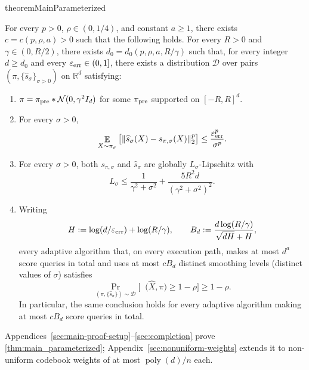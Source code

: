 \documentclass[11pt,letterpaper]{article}
\DeclareMathOperator*{\E}{\mathbb{E}}
\DeclareMathOperator*{\poly}{poly}
\newcommand{\1}{\mathbbm{1}}
\DeclareMathOperator{\TV}{d_{\mathrm{TV}}}
\begin{document}
\begin{restatable}{theorem}{MainParameterized}
  \label{thm:main_parameterized}

For every $p>0$, $\rho\in(0,1/4)$, and constant $a\ge1$, there exists
  $c=c(p,\rho,a)>0$ such that the following holds.
  For every $R>0$ and $\gamma\in(0,R/2)$, there exists
  $d_0=d_0(p,\rho,a,R/\gamma)$ such that, for every integer
  $d\ge d_0$ and every $\varepsilon_{\rm err}\in(0,1]$, there exists a distribution
  $\mathcal D$ over pairs
  $(\pi,\{\widehat s_\sigma\}_{\sigma>0})$ on $\mathbb R^d$
  satisfying:
  \begin{enumerate}[label=(\arabic*)]
    \item $\pi=\pi_{\rm pre}*\mathcal N(0,\gamma^2I_d)$ for some
      $\pi_{\rm pre}$ supported on $[-R,R]^d$.

    \item For every $\sigma>0$,
      \[
        \E_{X\sim \pi_\sigma}
        \big[\|\widehat s_\sigma(X)-s_{\pi,\sigma}(X)\|_2^p\big]
        \le \frac{\varepsilon_{\rm err}^p}{\sigma^p}.
      \]

    \item For every $\sigma>0$, both $s_{\pi,\sigma}$ and
      $\widehat s_\sigma$ are globally $L_\sigma$-Lipschitz with
      \[
        L_\sigma\le \frac{1}{\gamma^2+\sigma^2}
        +\frac{5R^2d}{(\gamma^2+\sigma^2)^2}.
      \]

    \item Writing
      \[
        H:=\log(d/\varepsilon_{\rm err})+\log(R/\gamma),
        \qquad
        B_d:=\frac{d\log(R/\gamma)}{\sqrt{dH}+H},
      \]
      every adaptive algorithm that, on every execution path, makes at
      most $d^a$ score queries in total and uses at most $cB_d$ distinct
      smoothing levels (distinct values of $\sigma$) satisfies
      \[
        \Pr_{(\pi,\{\widehat s_\sigma\})\sim\mathcal D}
        \Big[\TV\big(\widehat X,\pi\big)\ge 1-\rho\Big]
        \ge 1-\rho.
      \]
      In particular, the same conclusion holds for every adaptive
      algorithm making at most $cB_d$ score queries in total.
  \end{enumerate}
    \end{restatable}

Appendices~\ref{sec:main-proof-setup}--\ref{sec:completion} prove
\cref{thm:main_parameterized}; Appendix~\ref{sec:nonuniform-weights} extends
it to non-uniform codebook weights of at most $\poly(d)/n$ each.
\end{document}
